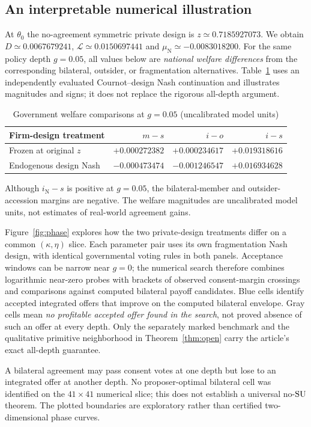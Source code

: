 \documentclass[11pt,a4paper]{article}
\theoremstyle{remark}\newtheorem{remark}[theorem]{Remark}
\newcommand{\N}{\mathrm{N}}\newcommand{\F}{\mathrm{F}}
\newcommand{\loss}{\mathcal L}\newcommand{\vect}[1]{\boldsymbol{#1}}
\begin{document}
\subsection{An interpretable numerical illustration}
At $\theta_0$ the no-agreement symmetric private design is $z\simeq0.7185927073$. We obtain $D\simeq0.0067679241$, $\loss\simeq0.0150697441$ and $\mu_{\N}\simeq-0.0083018200$. For the same policy depth $g=0.05$, all values below are \emph{national welfare differences} from the corresponding bilateral, outsider, or fragmentation alternatives. Table~\ref{tab:effects} uses an independently evaluated Cournot--design Nash continuation and illustrates magnitudes and signs; it does not replace the rigorous all-depth argument.
\begin{table}[ht]
\centering\small
\caption{Government welfare comparisons at $g=0.05$ (uncalibrated model units)}\label{tab:effects}
\begin{tabular}{lrrr}
\toprule
Firm-design treatment&$m-s$&$i-o$&$i-s$\\
\midrule
Frozen at original $z$&$+0.000272382$&$+0.000234617$&$+0.019318616$\\
Endogenous design Nash&$-0.000473474$&$-0.001246547$&$+0.016934628$\\
\bottomrule
\end{tabular}
\end{table}
Although $i_{\N}-s$ is positive at $g=0.05$, the bilateral-member and outsider-accession margins are negative. The welfare magnitudes are uncalibrated model units, not estimates of real-world agreement gains.

Figure~\ref{fig:phase} explores how the two private-design treatments differ on a common $(\kappa,\eta)$ slice. Each parameter pair uses its own fragmentation Nash design, with identical governmental voting rules in both panels. Acceptance windows can be narrow near $g=0$; the numerical search therefore combines logarithmic near-zero probes with brackets of observed consent-margin crossings and comparisons against computed bilateral payoff candidates. Blue cells identify accepted integrated offers that improve on the computed bilateral envelope. Gray cells mean \emph{no profitable accepted offer found in the search}, not proved absence of such an offer at every depth. Only the separately marked benchmark and the qualitative primitive neighborhood in Theorem~\ref{thm:open} carry the article's exact all-depth guarantee.

A bilateral agreement may pass consent votes at one depth but lose to an integrated offer at another depth. No proposer-optimal bilateral cell was identified on the $41\times41$ numerical slice; this does not establish a universal no-$\mathrm{SU}$ theorem. The plotted boundaries are exploratory rather than certified two-dimensional phase curves.
\end{document}
